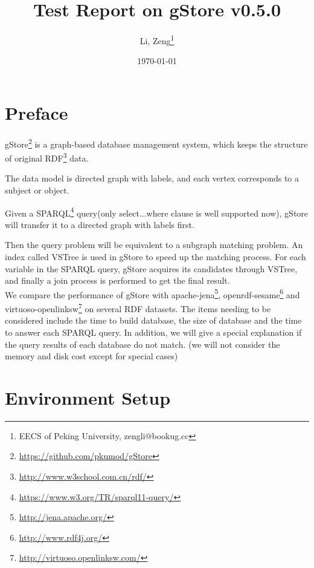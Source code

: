\documentclass[titlepage, a4paper, 12pt] {article}
\begin{document}
\title{\textbf{Test Report on gStore v0.5.0}}
\author{Li, Zeng\footnote{EECS of Peking University, zengli@bookug.cc}}
\date{\today}
\maketitle

\setcounter{tocdepth}{3}
\tableofcontents
\clearpage

\section{Preface}

gStore\footnote{\href{https://github.com/pkumod/gStore}{https://github.com/pkumod/gStore}} is a graph-based database management system, which keeps the structure of original RDF\footnote{\href{http://www.w3school.com.cn/rdf/}{http://www.w3school.com.cn/rdf/}} data. 

The data model is directed graph with labels, and each vertex corresponds to a subject or object. 

Given a SPARQL\footnote{\href{https://www.w3.org/TR/sparql11-query/}{https://www.w3.org/TR/sparql11-query/}} query(only select...where clause is well supported now), gStore will transfer it to a directed graph with labels first.

Then the query problem will be equivalent to a subgraph matching problem.
An index called VSTree is used in gStore to speed up the matching process. For each variable in the SPARQL query, gStore acquires its candidates through VSTree, and finally a join process is performed to get the final result.  \\

We compare the performance of gStore with apache-jena\footnote{\href{http://jena.apache.org/}{http://jena.apache.org/}}, openrdf-sesame\footnote{\href{http://www.rdf4j.org/}{http://www.rdf4j.org/}} and virtuoso-openlinksw\footnote{\href{http://virtuoso.openlinksw.com/}{http://virtuoso.openlinksw.com/}} on several RDF datasets.
The items needing to be considered include the time to build database, the size of database and the time to answer each SPARQL query.
In addition, we will give a special explanation if the query results of each database do not match.
(we will not consider the memory and disk cost except for special cases) \\

\clearpage

\section{Environment Setup}
\end{document}
